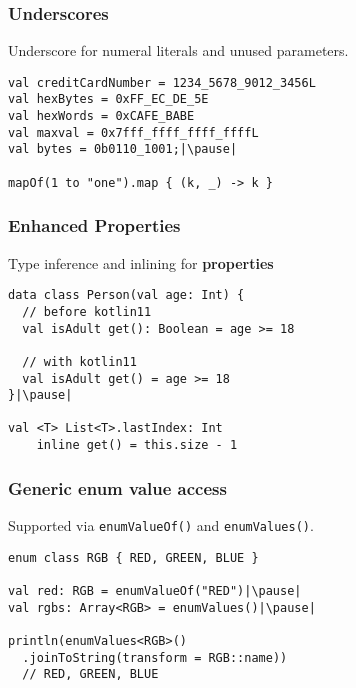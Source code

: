 
\begin{frame}[fragile] \frametitle{Underscores}
Underscore for numeral literals and unused parameters.  %
\begin{lstlisting}
val creditCardNumber = 1234_5678_9012_3456L
val hexBytes = 0xFF_EC_DE_5E
val hexWords = 0xCAFE_BABE
val maxval = 0x7fff_ffff_ffff_ffffL
val bytes = 0b0110_1001;|\pause|

mapOf(1 to "one").map { (k, _) -> k }
\end{lstlisting}
\end{frame}


\begin{frame}[fragile] \frametitle{Enhanced Properties}
Type inference and inlining for \textbf{properties} %
\begin{lstlisting}
data class Person(val age: Int) {
  // before kotlin11
  val isAdult get(): Boolean = age >= 18

  // with kotlin11
  val isAdult get() = age >= 18
}|\pause|

val <T> List<T>.lastIndex: Int
    inline get() = this.size - 1
\end{lstlisting}
\end{frame}


\begin{frame}[fragile] \frametitle{Generic enum value access}
Supported via \texttt{enumValueOf()} and \texttt{enumValues()}.
\begin{lstlisting}
enum class RGB { RED, GREEN, BLUE }

val red: RGB = enumValueOf("RED")|\pause|
val rgbs: Array<RGB> = enumValues()|\pause|

println(enumValues<RGB>()
  .joinToString(transform = RGB::name))
  // RED, GREEN, BLUE
\end{lstlisting}
\end{frame}


